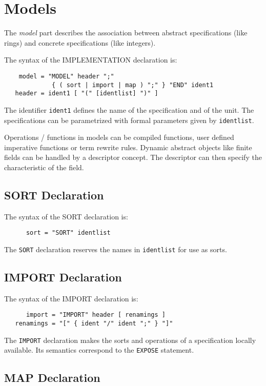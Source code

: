 \section{Models}

The {\em model} part describes the association between 
abstract specifications (like rings) and 
concrete specifications (like integers).

The syntax of the IMPLEMENTATION declaration is:
\begin{verbatim}
    model = "MODEL" header ";" 
             { ( sort | import | map ) ";" } "END" ident1
   header = ident1 [ "(" [identlist] ")" ]
\end{verbatim}
The identifier \verb/ident1/ defines the name 
of the specification and of the unit.
The specifications can be parametrized 
with formal parameters given by \verb/identlist/.  

Operations / functions in models can be compiled functions, 
user defined imperative functions or term rewrite rules. 
Dynamic abstract objects like finite fields can be handled 
by a descriptor concept. The descriptor can then specify 
the characteristic of the field.

\subsection{SORT Declaration}

The syntax of the SORT declaration is:
\begin{verbatim}
      sort = "SORT" identlist   
\end{verbatim}
The \verb/SORT/ declaration reserves the names 
in \verb/identlist/ for use as sorts.

\subsection{IMPORT Declaration}

The syntax of the IMPORT declaration is:
\begin{verbatim}
      import = "IMPORT" header [ renamings ]   
   renamings = "[" { ident "/" ident ";" } "]"
\end{verbatim}
The \verb/IMPORT/ declaration 
makes the sorts and operations of a specification 
locally available. Its semantics correspond to the 
\verb/EXPOSE/ statement.

\subsection{MAP Declaration}

